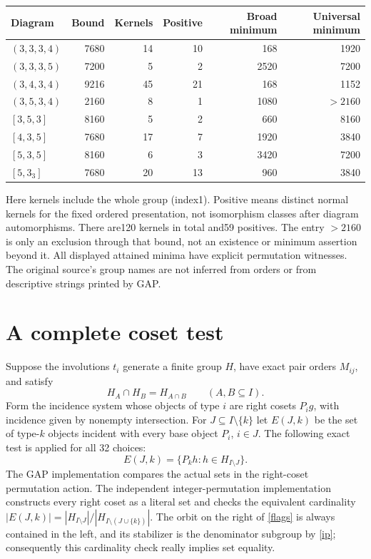 \documentclass[11pt]{article}
\begin{document}
\begin{center}\small
\begin{tabular}{lrrrrr}\toprule
Diagram & Bound & Kernels & Positive & Broad minimum & Universal minimum\\\midrule
$(3,3,3,4)$&7680&14&10&168&1920\\
$(3,3,3,5)$&7200&5&2&2520&7200\\
$(3,4,3,4)$&9216&45&21&168&1152\\
$(3,5,3,4)$&2160&8&1&1080&$>2160$\\
$[3,5,3]$&8160&5&2&660&8160\\
$[4,3,5]$&7680&17&7&1920&3840\\
$[5,3,5]$&8160&6&3&3420&7200\\
$[5,3_3]$&7680&20&13&960&3840\\\bottomrule
\end{tabular}
\end{center}
Here kernels include the whole group (index1). Positive means distinct
normal kernels for the fixed ordered presentation, not isomorphism classes
after diagram automorphisms. There are120 kernels in total and59 positives.
The entry $>2160$ is only an exclusion through that bound, not an existence
or minimum assertion beyond it. All displayed attained minima have explicit
permutation witnesses. The original source's group names are not inferred
from orders or from descriptive strings printed by GAP.

\section{A complete coset test}
Suppose the involutions $t_i$ generate a finite group $H$, have exact pair
orders $M_{ij}$, and satisfy
\begin{equation}\label{ip}
 H_A\cap H_B=H_{A\cap B}\qquad(A,B\subseteq I).
\end{equation}
Form the incidence system whose objects of type $i$ are right cosets
$P_i g$, with incidence given by nonempty intersection. For
$J\subseteq I\setminus\{k\}$ let $E(J,k)$ be the set of type-$k$ objects
incident with every base object $P_i$, $i\in J$. The following exact test
is applied for all 32 choices:
\begin{equation}\label{flags}
 E(J,k)=\{P_k h:h\in H_{I\setminus J}\}.
\end{equation}
The GAP implementation compares the actual sets in the right-coset
permutation action. The independent integer-permutation implementation
constructs every right coset as a literal set and checks the equivalent
cardinality
$|E(J,k)|=|H_{I\setminus J}|/|H_{I\setminus(J\cup\{k\})}|$.
The orbit on the right of \eqref{flags} is always contained in the left,
and its stabilizer is the denominator subgroup by \eqref{ip}; consequently
this cardinality check really implies set equality.
\end{document}
